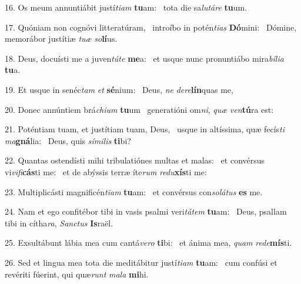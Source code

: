 16. Os meum annuntiábit justí\textit{ti}\textit{am} \textbf{tu}am: \ast\  tota die sa\textit{lu}\textit{tá}\textit{re} \textbf{tu}um.\

17. Quóniam non cognóvi litteratúram, \dag\  introíbo in potén\textit{ti}\textit{as} \textbf{Dó}mini: \ast\  Dómine, memorábor justítiæ \textit{tu}\textit{æ} \textit{so}\textbf{lí}us.\

18. Deus, docuísti me a juven\textit{tú}\textit{te} \textbf{me}a: \ast\  et usque nunc pronuntiábo mira\textit{bí}\textit{li}\textit{a} \textbf{tu}a.\

19. Et usque in senéc\textit{tam} \textit{et} \textbf{sé}nium: \ast\  Deus, \textit{ne} \textit{de}\textit{re}\textbf{lín}quas me,\

20. Donec annúntiem brá\textit{chi}\textit{um} \textbf{tu}um \ast\  generatióni om\textit{ni}, \textit{quæ} \textit{ven}\textbf{tú}ra est:\

21. Poténtiam tuam, et justítiam tuam, Deus, \dag\  usque in altíssima, quæ fecís\textit{ti} \textit{ma}\textbf{gná}lia: \ast\  Deus, quis \textit{sí}\textit{mi}\textit{lis} \textbf{ti}bi?\

22. Quantas ostendísti mihi tribulatiónes multas et malas: \dag\  et convérsus vi\textit{vi}\textit{fi}\textbf{cás}ti me: \ast\  et de abýssis terræ íte\textit{rum} \textit{re}\textit{du}\textbf{xís}ti me:\

23. Multiplicásti magnificén\textit{ti}\textit{am} \textbf{tu}am: \ast\  et convérsus con\textit{so}\textit{lá}\textit{tus} \textbf{es} me.\

24. Nam et ego confitébor tibi in vasis psalmi veri\textit{tá}\textit{tem} \textbf{tu}am: \ast\  Deus, psallam tibi in cítha\textit{ra}, \textit{Sanc}\textit{tus} \textbf{Is}raël.\

25. Exsultábunt lábia mea cum cantá\textit{ve}\textit{ro} \textbf{ti}bi: \ast\  et ánima mea, \textit{quam} \textit{red}\textit{e}\textbf{mís}ti.\

26. Sed et lingua mea tota die meditábitur justí\textit{ti}\textit{am} \textbf{tu}am: \ast\  cum confúsi et revériti fúerint, qui quæ\textit{runt} \textit{ma}\textit{la} \textbf{mi}hi.\

